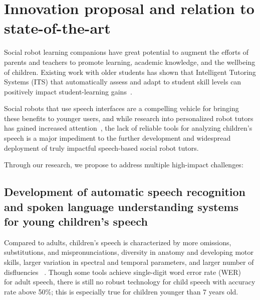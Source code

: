 \section{Innovation proposal and relation to state-of-the-art}
\vspace{-3mm}   
Social robot learning companions have great potential to augment the efforts of parents and teachers to promote learning, academic knowledge, and the wellbeing of children. Existing work with older students has shown that Intelligent Tutoring Systems (ITS) that automatically assess and adapt to student skill levels can positively impact student-learning gains~\cite{desmarais2012review}. 


Social robots that use speech interfaces are a compelling vehicle for bringing these benefits to younger users, and while research into personalized robot tutors has gained increased attention~\cite{leyzberg2014personalizing}, the lack of reliable tools for analyzing children's speech is a major impediment to the further development and widespread deployment of truly impactful speech-based social robot tutors.

Through our research, we propose to address multiple high-impact challenges:

\subsection{Development of automatic speech recognition and spoken language understanding systems for young children's speech}
\label{section_ASR}
Compared to adults, children's speech is characterized by more omissions, substitutions, and mispronunciations, diversity in anatomy and developing motor skills, larger variation in spectral and temporal parameters, and larger number of disfluencies ~\cite{kennedy2017child, fainberg2016improving}. Though some tools achieve single-digit word error rate (WER) ~\cite{saon2015ibm, price2009assessment} for adult speech, there is still no robust technology for child speech with accuracy rate above 50\%; this is especially true for children younger than 7 years old.

